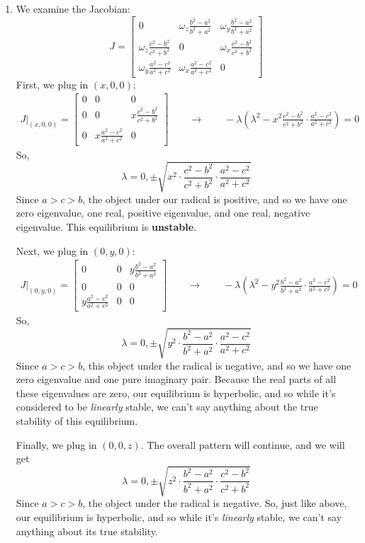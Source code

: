 \documentclass[10pt,letterpaper]{report}
\newcommand{\mtx}[2]{\left[\begin{array}{#1}#2\end{array}\right]}
\begin{document}
\begin{enumerate}
\begin{enumerate}
    \item We examine the Jacobian:
    \[
    J = \mtx{ccc}{
    0 & \omega_z\frac{b^2-a^2}{b^2+a^2} & \omega_y\frac{b^2-a^2}{b^2+a^2} \\
    \omega_z\frac{c^2-b^2}{c^2+b^2} & 0 & \omega_x\frac{c^2-b^2}{c^2+b^2} \\
    \omega_y\frac{a^2-c^2}{a^2+c^2} & \omega_x\frac{a^2-c^2}{a^2+c^2} & 0
    }
    \]
    First, we plug in $(x, 0, 0)$:
    \begin{align*}
        J\big\vert_{(x, 0, 0)} = \mtx{ccc}{
        0 & 0 & 0 \\
        0 & 0 & x\frac{c^2-b^2}{c^2+b^2} \\
        0 & x\frac{a^2-c^2}{a^2+c^2} & 0
        }
        \qquad
        \rightarrow
        \qquad 
        -\lambda\left(\lambda^2 - x^2\frac{c^2-b^2}{c^2+b^2}\cdot\frac{a^2-c^2}{a^2+c^2}\right) = 0
    \end{align*}
    So,
    \[
    \lambda = 0, \pm \sqrt{x^2\cdot \frac{c^2-b^2}{c^2+b^2}\cdot\frac{a^2-c^2}{a^2+c^2}}
    \]
    Since $a > c > b$, the object under our radical is positive, and so we have one zero eigenvalue, one real, positive eigenvalue, and one real, negative eigenvalue. This equilibrium is \textbf{unstable}.
    
    Next, we plug in $(0, y, 0)$:
    \begin{align*}
        J\big\vert_{(0, y, 0)} = \mtx{ccc}{
        0 & 0 & y\frac{b^2-a^2}{b^2+a^2} \\
        0 & 0 & 0 \\
        y\frac{a^2-c^2}{a^2+c^2} & 0 & 0
        }
        \qquad
        \rightarrow
        \qquad 
        -\lambda\left(\lambda^2 - y^2\frac{b^2-a^2}{b^2+a^2}\cdot\frac{a^2-c^2}{a^2+c^2}\right) = 0
    \end{align*}
    So,
    \[
    \lambda = 0, \pm\sqrt{y^2\cdot  \frac{b^2-a^2}{b^2+a^2}\cdot\frac{a^2-c^2}{a^2+c^2}}
    \]
    Since $a > c > b$, this object under the radical is negative, and so we have one zero eigenvalue and one pure imaginary pair. Because the real parts of all these eigenvalues are zero, our equilibrium is hyperbolic, and so while it's considered to be \textit{linearly} stable, we can't say anything about the true stability of this equilibrium.
    
    Finally, we plug in $(0, 0, z)$. The overall pattern will continue, and we will get
    \[
    \lambda = 0, \pm \sqrt{z^2 \cdot \frac{b^2 - a^2}{b^2 + a^2}\cdot \frac{c^2 - b^2}{c^2 + b^2} }
    \]
    Since $a > c > b$, the object under the radical is negative. So, just like above, our equilibrium is hyperbolic, and so while it's \textit{linearly} stable, we can't say anything about its true stability.
\end{enumerate}


\end{enumerate}
\end{document}
